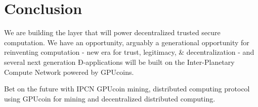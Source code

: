 \documentclass{article}
\begin{document}
\section{Conclusion}
We are building the layer that will power decentralized trusted secure computation. We have an opportunity, arguably a generational opportunity for reinventing computation - new era for trust, legitimacy, \& decentralization - and several next generation Ð-applications will be built on the Inter-Planetary Compute Network powered by GPUcoins.


Bet on the future with IPCN GPUcoin mining, distributed computing protocol using GPUcoin for mining and decentralized distributed computing.





\newpage
\listoffigures
\newpage 
\listoftables
\newpage 

\end{document}
